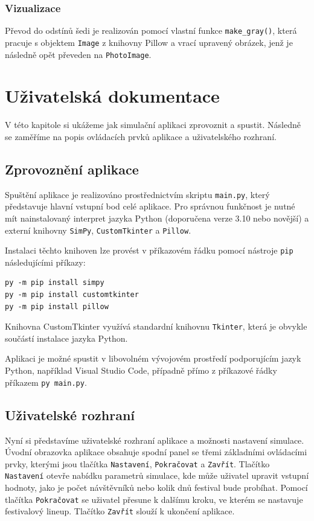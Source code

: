\documentclass[
  program=itp,
  biblatex,
  figures=false,
  glossaries,
  index
]{kidiplom}
\begin{document}
\subsubsection{Vizualizace}

Převod do odstínů šedi je realizován pomocí vlastní funkce \texttt{make\_gray()}, která pracuje s objektem \texttt{Image} z knihovny Pillow a vrací upravený obrázek, jenž je následně opět převeden na \texttt{PhotoImage}. 

\section{Uživatelská dokumentace}
V této kapitole si ukážeme jak simulační aplikaci zprovoznit a spustit. Následně se zaměříme na popis ovládacích prvků aplikace a uživatelského rozhraní.

\subsection{Zprovoznění aplikace}

Spuštění aplikace je realizováno prostřednictvím skriptu \texttt{main.py}, který představuje hlavní vstupní bod celé aplikace. Pro správnou funkčnost je nutné mít nainstalovaný interpret jazyka Python (doporučena verze 3.10 nebo novější) a externí knihovny \texttt{SimPy}, \texttt{CustomTkinter} a \texttt{Pillow}.

\noindent Instalaci těchto knihoven lze provést v příkazovém řádku pomocí nástroje \texttt{pip} následujícími příkazy:

\begin{verbatim}
py -m pip install simpy
py -m pip install customtkinter
py -m pip install pillow
\end{verbatim}

Knihovna {CustomTkinter} využívá standardní knihovnu \texttt{Tkinter}, která je obvykle součástí instalace jazyka Python.

Aplikaci je možné spustit v libovolném vývojovém prostředí podporujícím jazyk Python, například Visual Studio Code, případně přímo z příkazové řádky příkazem \texttt{py main.py}.

\subsection{Uživatelské rozhraní}
Nyní si představíme uživatelské rozhraní aplikace a možnosti nastavení simulace. Úvodní obrazovka aplikace obsahuje spodní panel se třemi základními ovládacími prvky, kterými jsou tlačítka \texttt{Nastavení}, \texttt{Pokračovat} a \texttt{Zavřít}. Tlačítko \texttt{Nastavení} otevře nabídku parametrů simulace, kde může uživatel upravit vstupní hodnoty, jako je počet návštěvníků nebo kolik dnů festival bude probíhat. Pomocí tlačítka \texttt{Pokračovat} se uživatel přesune k dalšímu kroku, ve kterém se nastavuje festivalový lineup. Tlačítko \texttt{Zavřít} slouží k ukončení aplikace. 
\end{document}
